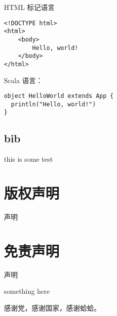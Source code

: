 \documentclass[%
               print, 
              ]{xjtubsc}
\begin{document}
HTML 标记语言
\begin{verbatim}
<!DOCTYPE html>
<html>
    <body>
        Hello, world!
    </body>
</html>
\end{verbatim}

Scala  语言：
\begin{verbatim}
object HelloWorld extends App {
  println("Hello, world!")
}
\end{verbatim}

\subsection{bib}

this is some test\cite{IEEE-1363,Krasnogor2004e}
\section{版权声明}
声明

\section{免责声明}
声明

\backmatter

\nocite{*}




something here



\begin{acknowledgment}
感谢党，感谢国家，感谢蛤蛤。
\end{acknowledgment}
\end{document}

